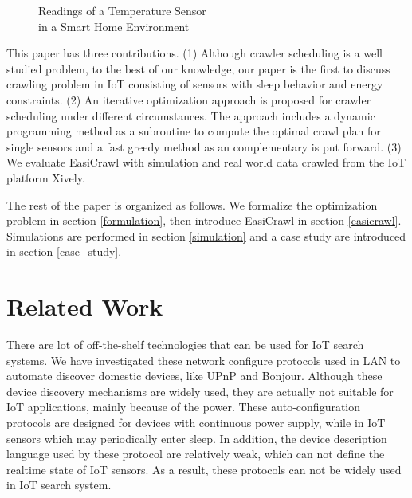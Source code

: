 \documentclass[conference]{IEEEtran}
\begin{document}
\begin{figure}
	\centering
	\hspace{-3.0em}
	
	\captionsetup{justification=centering}
	\caption{Readings of a Temperature Sensor\\ in a Smart Home Environment}
	\vspace{-1.0em}
	\label{fig:smarthome}
\end{figure}

This paper has three contributions.
(1) Although crawler scheduling is a well studied problem, to the best of our knowledge, our paper is the first to discuss crawling problem in IoT consisting of sensors with sleep behavior and energy constraints.
(2) An iterative optimization approach is proposed for crawler scheduling under different circumstances. 
The approach includes a dynamic programming method as a subroutine to compute the optimal crawl plan for single sensors and a fast greedy method as an complementary is put forward.
(3) We evaluate EasiCrawl with simulation and real world data crawled from the IoT platform Xively\cite{xively}.

The rest of the paper is organized as follows. 
We formalize the optimization problem in section \ref{formulation}, then introduce EasiCrawl in section \ref{easicrawl}. 
Simulations are performed in section \ref{simulation} and a case study are introduced in section \ref{case_study}. 

\section{Related Work}\label{related_work}

There are lot of off-the-shelf technologies that can be used for IoT search systems.
We have investigated these network configure protocols used in LAN to automate discover domestic devices, like UPnP\cite{UPnP} and Bonjour\cite{Bonjour}.
Although these device discovery mechanisms are widely used, they are actually not suitable for IoT applications, mainly because of the power. 
These auto-configuration protocols are designed for devices with continuous power supply, while in IoT sensors which may periodically enter sleep.
In addition, the device description language used by these protocol are relatively weak, which can not define the realtime state of IoT sensors. 
As a result, these protocols can not be widely used in IoT search system.
\end{document}
